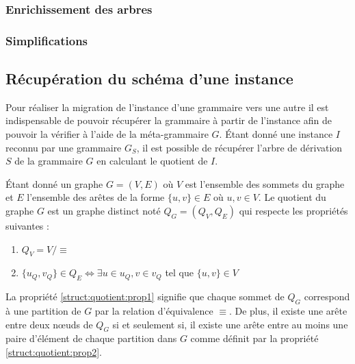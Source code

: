 \subsubsection{Enrichissement des arbres}

\subsubsection{Simplifications}

\subsection{Récupération du schéma d'une instance}

Pour réaliser la migration de l'instance d'une grammaire vers une autre il est indispensable de pouvoir récupérer la grammaire à partir de l'instance afin de pouvoir la vérifier à l'aide de la méta-grammaire $G$.
Étant donné une instance $I$ reconnu par une grammaire $G_S$, il est possible de récupérer l'arbre de dérivation $S$ de la grammaire $G$ en calculant le quotient de $I$. 

\begin{definition}
    Étant donné un graphe $G = (V, E)$ où $V$ est l'ensemble des sommets du graphe et $E$ l'ensemble des arêtes de la forme $\{u, v\} \in E$ où $u, v \in V$.
    Le quotient du graphe $G$ est un graphe distinct noté $Q_G = (Q_V, Q_E)$ qui respecte les propriétés suivantes :
    \begin{enumerate}
        \item \label{struct:quotient:prop1} $Q_V = V / \equiv$
        \item \label{struct:quotient:prop2} $\{u_Q, v_Q\} \in Q_E \iff \exists u \in u_Q, v \in v_Q$ tel que $\{u, v\} \in V$
    \end{enumerate}
    La propriété \ref{struct:quotient:prop1} signifie que chaque sommet de $Q_G$ correspond à une partition de $G$ par la relation d'équivalence $\equiv$.
    De plus, il existe une arête entre deux nœuds de $Q_G$ si et seulement si, il existe une arête entre au moins une paire d'élément de chaque partition dans $G$ comme définit par la propriété \ref{struct:quotient:prop2}.
\end{definition}

